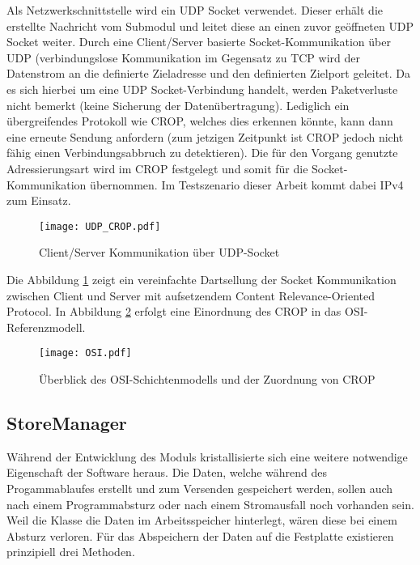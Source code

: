 Als Netzwerkschnittstelle wird ein \gls{UDP} Socket verwendet. Dieser erh{\"a}lt die
erstellte Nachricht vom Submodul  und leitet diese an einen
zuvor ge{\"o}ffneten \gls{UDP} Socket weiter. Durch eine Client/Server basierte
Socket-Kommunikation {\"u}ber \gls{UDP} (verbindungslose Kommunikation im Gegensatz
zu \gls{TCP} wird der Datenstrom an die definierte Zieladresse und den
definierten Zielport geleitet. Da es sich hierbei um eine \gls{UDP} Socket-Verbindung handelt,
werden Paketverluste nicht bemerkt (keine Sicherung der Daten{\"u}bertragung).
Lediglich ein {\"u}bergreifendes Protokoll wie \gls{CROP}, welches dies erkennen
k{\"o}nnte, kann dann eine erneute Sendung anfordern (zum jetzigen Zeitpunkt
ist \gls{CROP} jedoch nicht f{\"a}hig einen Verbindungsabbruch zu detektieren). Die
f{\"u}r den Vorgang genutzte Adressierungsart wird im \gls{CROP} festgelegt
und somit f{\"u}r die Socket-Kommunikation {\"u}bernommen. Im Testszenario
dieser Arbeit kommt dabei IPv4 zum Einsatz.

\begin{figure}[H]
\centering
\texttt{[image: UDP\_CROP.pdf]}
\caption{Client/Server Kommunikation {\"u}ber UDP-Socket}
\label{fig:Socket-Kommunikation}
\end{figure}

Die Abbildung \ref{fig:Socket-Kommunikation} zeigt ein vereinfachte Dartsellung
der Socket Kommunikation zwischen Client und Server mit aufsetzendem Content
Relevance-Oriented Protocol. In Abbildung \ref{fig:OSI} erfolgt eine Einordnung
des \gls{CROP} in das OSI-Referenzmodell.

\begin{figure}[H]
\centering
\texttt{[image: OSI.pdf]}
\caption{{\"U}berblick des OSI-Schichtenmodells und der Zuordnung von CROP}
\label{fig:OSI}
\end{figure}

\subsection{StoreManager}

W{\"a}hrend der Entwicklung des Moduls  kristallisierte sich eine
weitere notwendige Eigenschaft der Software heraus.
Die Daten, welche w{\"a}hrend des Progammablaufes erstellt und zum Versenden
gespeichert werden, sollen auch nach einem Programmabsturz oder nach einem
Stromausfall noch vorhanden sein. Weil die Klasse 
die Daten im Arbeitsspeicher hinterlegt, w{\"a}ren diese bei einem Absturz
verloren.
F{\"u}r das Abspeichern der Daten auf die Festplatte existieren prinzipiell drei Methoden.

